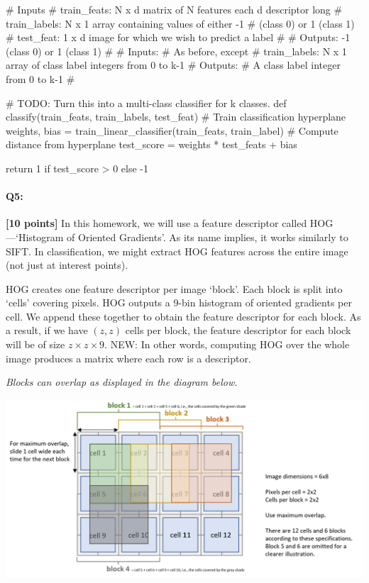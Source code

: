 \begin{python}
# Inputs
#   train_feats: N x d matrix of N features each d descriptor long
#   train_labels: N x 1 array containing values of either -1 
#               (class 0) or 1 (class 1)
#   test_feat: 1 x d image for which we wish to predict a label
#
#   Outputs: -1 (class 0) or 1 (class 1)
#
# Inputs:
#    As before, except
#    train_labels: N x 1 array of class label integers from 0 to k-1
# Outputs:
#    A class label integer from 0 to k-1
#

# TODO: Turn this into a multi-class classifier for k classes.
def classify(train_feats, train_labels, test_feat)
    # Train classification hyperplane
    weights, bias = train_linear_classifier(train_feats, train_label)
    # Compute distance from hyperplane
    test_score = weights * test_feats + bias

    return 1 if test_score > 0 else -1
\end{python}


\pagebreak

\paragraph{Q5:} \textbf{[10 points]} In this homework, we will use a feature descriptor called HOG---`Histogram of Oriented Gradients'. As its name implies, it works similarly to SIFT. In classification, we might extract HOG features across the entire image (not just at interest points).

HOG creates one feature descriptor per image `block'. Each block is split into `cells' covering pixels. HOG outputs a 9-bin histogram of oriented gradients per cell. We append these together to obtain the feature descriptor for each block. As a result, if we have $(z,z)$ cells per block, the feature descriptor for each block will be of size $z \times z \times 9$. NEW: In other words, computing HOG over the whole image produces a matrix where each row is a descriptor. 

\emph{Blocks can overlap as displayed in the diagram below.}

    \includegraphics[width=1.3\textwidth]{images/hog-diagram.png}

